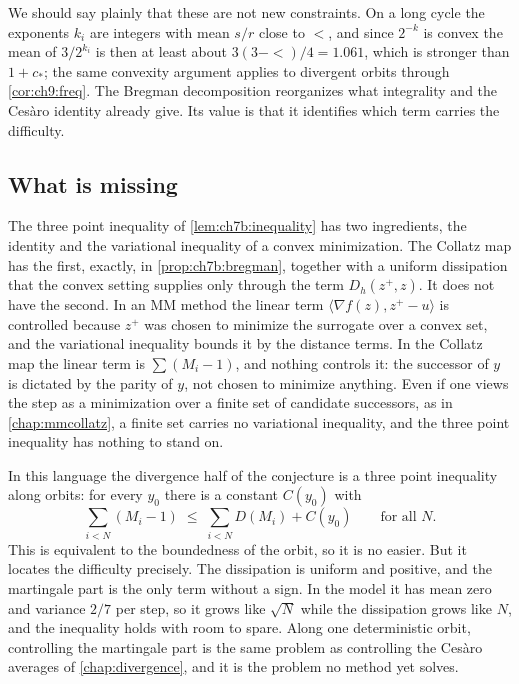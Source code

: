 We should say plainly that these are not new constraints. On a long cycle the
exponents $k_i$ are integers with mean $s/r$ close to $\lt$, and since $2^{-k}$
is convex the mean of $3/2^{k_i}$ is then at least about
$3(3-\lt)/4=1.061$, which is stronger than $1+c_*$; the same convexity argument
applies to divergent orbits through \cref{cor:ch9:freq}. The Bregman
decomposition reorganizes what integrality and the Ces\`aro identity already
give. Its value is that it identifies which term carries the difficulty.

\subsection{What is missing}

The three point inequality of \cref{lem:ch7b:inequality} has two ingredients,
the identity and the variational inequality of a convex minimization. The
Collatz map has the first, exactly, in \cref{prop:ch7b:bregman}, together with
a uniform dissipation that the convex setting supplies only through the term
$D_h(z^+,z)$. It does not have the second. In an MM method the linear term
$\langle\nabla f(z),z^+-u\rangle$ is controlled because $z^+$ was chosen to
minimize the surrogate over a convex set, and the variational inequality
bounds it by the distance terms. In the Collatz map the linear term is
$\sum(M_i-1)$, and nothing controls it: the successor of $y$ is dictated by the
parity of $y$, not chosen to minimize anything. Even if one views the step as a
minimization over a finite set of candidate successors, as in
\cref{chap:mmcollatz}, a finite set carries no variational inequality, and the
three point inequality has nothing to stand on.

In this language the divergence half of the conjecture is a three point
inequality along orbits: for every $y_0$ there is a constant $C(y_0)$ with
\[
  \sum_{i<N}(M_i-1)\;\le\;\sum_{i<N}D(M_i)+C(y_0)\qquad\text{for all }N.
\]
This is equivalent to the boundedness of the orbit, so it is no easier. But it
locates the difficulty precisely. The dissipation is uniform and positive, and
the martingale part is the only term without a sign. In the model it has mean
zero and variance $2/7$ per step, so it grows like $\sqrt N$ while the
dissipation grows like $N$, and the inequality holds with room to spare. Along
one deterministic orbit, controlling the martingale part is the same problem
as controlling the Ces\`aro averages of \cref{chap:divergence}, and it is the
problem no method yet solves.

